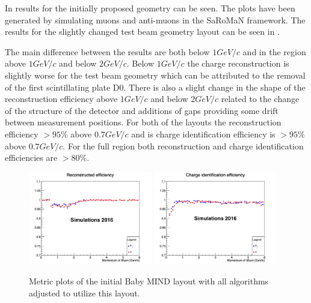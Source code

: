 In  results for the initially proposed geometry can be seen. The plots have been generated by simulating muons and anti-muons in the SaRoMaN framework. The results for the slightly changed test beam geometry layout can be seen in  . 

The main difference between the results are both below $1 GeV/c$ and in the region above $1 GeV/c$ and below $2 GeV/c$. Below $1 GeV/c$ the charge reconstruction is slightly worse for the test beam geometry which can be attributed to the removal of the first scintillating plate D0. There is also a slight change in the shape of the reconstruction efficiency above $1 GeV/c$ and below $2 GeV/c$ related to the change of the structure of the detector and additions of gaps providing some drift between measurement positions. For both of the layouts the reconstruction efficiency $> 95\%$ above $0.7 GeV/c$ and  is charge identification efficiency is $> 95\%$ above $0.7 GeV/c$. For the full region both reconstruction and charge identification efficiencies are $> 80\% $. 

\begin{figure}[h!]
\centering
\includegraphics[width=0.48\textwidth]{figures/oldStudies/oldRecEff.png}
\includegraphics[width=0.48\textwidth]{figures/oldStudies/oldChargeID.png}
\caption{Metric plots of the initial Baby MIND layout with all algorithms adjusted to utilize this layout.}
\label{fig:oldMIND2}
\end{figure}

